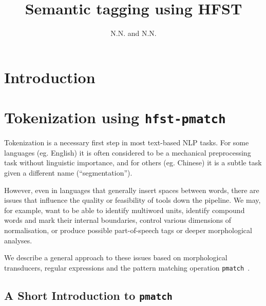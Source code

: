 \documentclass{llncs}
\begin{document}
%
\title{Semantic tagging using HFST}
%
\author{N.N. and N.N.}


\maketitle


\begin{abstract}
\end{abstract}

\section*{Introduction}

\section{Tokenization using {\tt hfst-pmatch}}\label{sec:tokenization}
Tokenization is a necessary first step in most text-based NLP tasks. For some
languages (eg. English) it is often considered to be a mechanical
preprocessing task without linguistic importance, and for others (eg. Chinese)
it is a subtle task given a different name (``segmentation'').

However, even in languages that generally insert spaces between words, there
are issues that influence the quality or feasibility of tools down the
pipeline. We may, for example, want to be able to identify multiword units,
identify compound words and mark their internal boundaries, control various
dimensions of normalisation, or produce possible part-of-speech tags or
deeper morphological analyses.

We describe a general approach to these issues based on morphological
transducers, regular expressions and the pattern matching operation
\verb+pmatch+~\cite{pmatchcite}.

\subsection{A Short Introduction to {\tt pmatch}}
\end{document}
